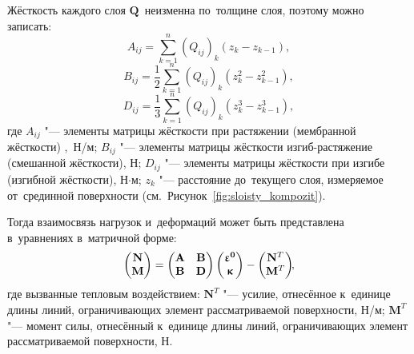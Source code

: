 Жёсткость каждого слоя $\mathbf{Q}$~неизменна по~толщине слоя, поэтому можно записать:
\[
A_{ij} = \sum\limits_{k=1}^n (Q_{ij})_k (z_k - z_{k-1}),
\]
\[
B_{ij} = \frac{1}{2} \sum\limits_{k=1}^n (Q_{ij})_k (z_k^2 - z_{k-1}^2),
\]
\[
D_{ij} = \frac{1}{3} \sum\limits_{k=1}^n (Q_{ij})_k (z_k^3 - z_{k-1}^3),
\]
где $ A_{ij} $ "--- элементы матрицы жёсткости при растяжении (мембранной жёсткости) \cites[157]{kristensen1982_per_Vved_v_kompozit}[С.~70,~79]{Vasiljev1988_Meh_konstr_kompozit},~Н/м;
$ B_{ij} $ "--- элементы матрицы жёсткости изгиб\nb-растяжение (смешанной жёсткости), Н;
$ D_{ij} $ "--- элементы матрицы жёсткости при изгибе (изгибной жёсткости), Н$\cdot$м;
$ z_k $ "--- расстояние до~текущего слоя, измеряемое от~срединной поверхности (см.~Рисунок~\ref{fig:sloisty_kompozit}).

Тогда взаимосвязь нагрузок и~деформаций может быть представлена в~уравнениях в~матричной форме:
\begin{equation}\label{eq:n_m_eps_kap_simp_matrix_comb}
\left(
    \begin{array}{@{}c@{}}
        \mathbf{N} \\
        \mathbf{M}
    \end{array}
\right)
=
\left(
    \begin{array}{@{}cc@{}}
        \mathbf{A} & \mathbf{B} \\
        \mathbf{B} & \mathbf{D}
    \end{array}
\right)
\left(
    \begin{array}{@{}c@{}}
        \boldsymbol{\epsilon^0} \\
        \boldsymbol{\kappa}
    \end{array}
\right)
-
\left(
    \begin{array}{@{}c@{}}
        \mathbf{N}^T \\
        \mathbf{M}^T
    \end{array}
\right)\!\!,
\end{equation}
где вызванные тепловым воздействием:
$ \mathbf{N}^T $ "--- усилие, отнесённое к~единице длины линий,
ограничивающих элемент рассматриваемой поверхности, Н/м;
$ \mathbf{M}^T $ "--- момент силы, отнесённый к~единице длины линий,
ограничивающих элемент рассматриваемой поверхности, Н.

